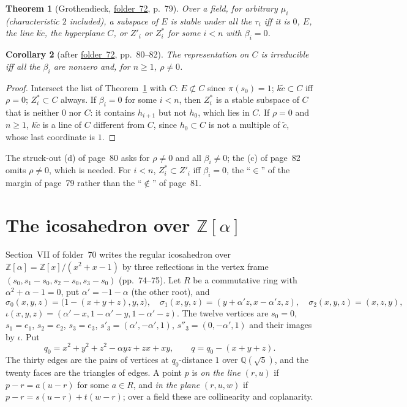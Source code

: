 \documentclass[11pt,a4paper]{amsart}
\newtheorem{theorem}{Theorem}[section]
\newtheorem{corollary}[theorem]{Corollary}
\theoremstyle{definition}
\theoremstyle{remark}
\newcommand{\Z}{\mathbb Z}
\newcommand{\Q}{\mathbb Q}
\newcommand{\fac}[1]{\href{https://grothendieck.umontpellier.fr/#1.pdf}{folder~#1}}
\begin{document}
\begin{theorem}[Grothendieck, \fac{72}, p.~79]\label{thm:inv}
Over a field, for arbitrary $\mu_i$ (characteristic $2$ included), a subspace of $E$ is stable under all the $\tau_i$ iff it is $0$, $E$, the line $k\tilde c$, the hyperplane $C$, or $Z'_i$ or $Z^*_i$ for some $i < n$ with $\beta_i = 0$.
\end{theorem}

\begin{corollary}[after \fac{72}, pp.~80--82]\label{cor:irr}
The representation on $C$ is irreducible iff all the $\beta_i$ are nonzero and, for $n \ge 1$, $\rho \ne 0$.
\end{corollary}

\begin{proof}
Intersect the list of Theorem~\ref{thm:inv} with $C$: $E \not\subset C$ since $\pi(s_0) = 1$; $k\tilde c \subset C$ iff $\rho = 0$; $Z^*_i \subset C$ always. If $\beta_i = 0$ for some $i < n$, then $Z^*_i$ is a stable subspace of $C$ that is neither $0$ nor $C$: it contains $h_{i+1}$ but not $h_0$, which lies in $C$. If $\rho = 0$ and $n \ge 1$, $k\tilde c$ is a line of $C$ different from $C$, since $h_0 \subset C$ is not a multiple of $\tilde c$, whose last coordinate is $1$.
\end{proof}

The struck-out (d) of page~80 asks for $\rho \ne 0$ and all $\beta_i \ne 0$; the (c) of page~82 omits $\rho \ne 0$, which is needed. For $i < n$, $Z^*_i \subset Z'_i$ iff $\beta_i = 0$, the ``$\in$'' of the margin of page~79 rather than the ``$\notin$'' of page~81.

\section{The icosahedron over \texorpdfstring{$\Z[\alpha]$}{Z[alpha]}}\label{sec:ico}

Section~VII of folder~70 writes the regular icosahedron over $\Z[\alpha] = \Z[x]/(x^2 + x - 1)$ by three reflections in the vertex frame $(s_0, s_1 - s_0, s_2 - s_0, s_3 - s_0)$ (pp.~74--75). Let $R$ be a commutative ring with $\alpha^2 + \alpha - 1 = 0$, put $\alpha' = -1 - \alpha$ (the other root), and
\[
\sigma_0(x,y,z) = \bigl(1 - (x+y+z), y, z\bigr),\quad \sigma_1(x,y,z) = (y + \alpha'z, x - \alpha'z, z),\quad \sigma_2(x,y,z) = (x, z, y),
\]
$\iota(x,y,z) = (\alpha' - x, 1 - \alpha' - y, 1 - \alpha' - z)$. The twelve vertices are $s_0 = 0$, $s_1 = e_1$, $s_2 = e_2$, $s_3 = e_3$, $s'_3 = (\alpha', -\alpha', 1)$, $s''_3 = (0, -\alpha', 1)$ and their images by $\iota$. Put
\[
q_0 = x^2 + y^2 + z^2 - \alpha yz + zx + xy, \qquad q = q_0 - (x + y + z).
\]
The thirty edges are the pairs of vertices at $q_0$-distance $1$ over $\Q(\sqrt5)$, and the twenty faces are the triangles of edges. A point $p$ is \emph{on the line} $(r, u)$ if $p - r = a(u - r)$ for some $a \in R$, and \emph{in the plane} $(r, u, w)$ if $p - r = s(u - r) + t(w - r)$; over a field these are collinearity and coplanarity.
\end{document}
